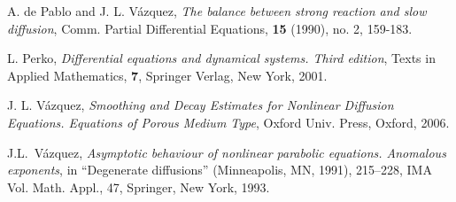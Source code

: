 \documentclass[a4paper,11pt]{article}
\numberwithin{equation}{section}
\begin{document}
\begin{thebibliography}{1}
A. de Pablo and J. L. V\'azquez, \emph{The balance between strong reaction and slow diffusion}, Comm. Partial Differential Equations, \textbf{15} (1990), no. 2, 159-183.

L. Perko, \emph{Differential equations and dynamical systems. Third
edition}, Texts in Applied Mathematics, \textbf{7}, Springer Verlag,
New York, 2001.

J. L. V\'azquez, \emph{Smoothing and Decay Estimates for Nonlinear
Diffusion Equations. Equations of Porous Medium Type}, Oxford Univ.
Press, Oxford, 2006.

J.L.~V\'azquez, \emph{Asymptotic behaviour of nonlinear parabolic equations. Anomalous exponents}, in ``Degenerate diffusions'' (Minneapolis, MN, 1991), 215--228, IMA Vol. Math. Appl., 47, Springer, New York, 1993.

\end{thebibliography}
\end{document}
